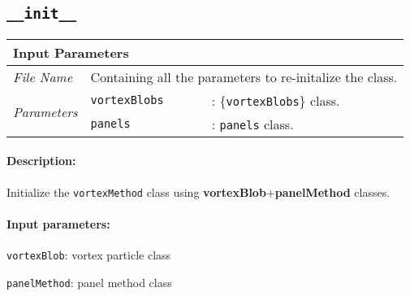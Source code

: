 %
%

\subsection{\texttt{\_\_init\_\_}}
	\begin{tabular}{l|lp{7cm}}
		\multicolumn{2}{l}{\textbf{Input Parameters}} & \\ \hline
		\textit{File Name} & \multicolumn{2}{l}{Containing all the parameters to re-initalize the class.} \\ \hline
		\multirow{2}{*}{\textit{Parameters}} & \texttt{vortexBlobs} &: \{\texttt{vortexBlobs}\} class. \\ \cline{2-3}
		& \texttt{panels} &: \texttt{panels} class. \\ \cline{2-3}
	\end{tabular}
	\paragraph{Description:} Initialize the \texttt{vortexMethod} class using \textbf{vortexBlob}+\textbf{panelMethod} classes.
	\paragraph{Input parameters:}
	\begin{list}{\quad}{}
	\item \texttt{vortexBlob}: vortex particle class
	\item \texttt{panelMethod}: panel method class				
	\end{list}

